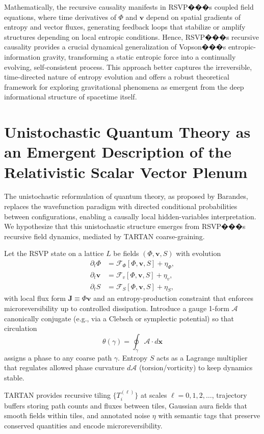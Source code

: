 \documentclass[11pt]{article}
\theoremstyle{plain}
\theoremstyle{definition}
\begin{document}
Mathematically, the recursive causality manifests in RSVP���s coupled field equations, where time derivatives of $\Phi$ and $\mathbf{v}$ depend on spatial gradients of entropy and vector fluxes, generating feedback loops that stabilize or amplify structures depending on local entropic conditions. Hence, RSVP���s recursive causality provides a crucial dynamical generalization of Vopson���s entropic-information gravity, transforming a static entropic force into a continually evolving, self-consistent process. This approach better captures the irreversible, time-directed nature of entropy evolution and offers a robust theoretical framework for exploring gravitational phenomena as emergent from the deep informational structure of spacetime itself.

\section{Unistochastic Quantum Theory as an Emergent Description of the Relativistic Scalar Vector Plenum}
The unistochastic reformulation of quantum theory, as proposed by Barandes, replaces the wavefunction paradigm with directed conditional probabilities between configurations, enabling a causally local hidden-variables interpretation. We hypothesize that this unistochastic structure emerges from RSVP���s recursive field dynamics, mediated by TARTAN coarse-graining.

Let the RSVP state on a lattice $L$ be fields $(\Phi,\bm{v},S)$ with evolution
\begin{align}
\partial_t \Phi &= \mathcal{F}_\Phi[\Phi,\bm{v},S] + \eta_\Phi, \\
\partial_t \bm{v} &= \mathcal{F}_v[\Phi,\bm{v},S] + \eta_v, \\
\partial_t S &= \mathcal{F}_S[\Phi,\bm{v},S] + \eta_S,
\end{align}
with local flux form $\bm{J} \equiv \Phi \bm{v}$ and an entropy-production constraint that enforces microreversibility up to controlled dissipation. Introduce a gauge 1-form $\mathcal{A}$ canonically conjugate (e.g., via a Clebsch or symplectic potential) so that circulation
\[
\theta(\gamma) = \oint_\gamma \mathcal{A} \cdot d\bm{x}
\]
assigns a phase to any coarse path $\gamma$. Entropy $S$ acts as a Lagrange multiplier that regulates allowed phase curvature $d\mathcal{A}$ (torsion/vorticity) to keep dynamics stable.

TARTAN provides recursive tiling $\{T_i^{(\ell)}\}$ at scales $\ell = 0,1,2,\dots$, trajectory buffers storing path counts and fluxes between tiles, Gaussian aura fields that smooth fields within tiles, and annotated noise $\eta$ with semantic tags that preserve conserved quantities and encode microreversibility.
\end{document}
